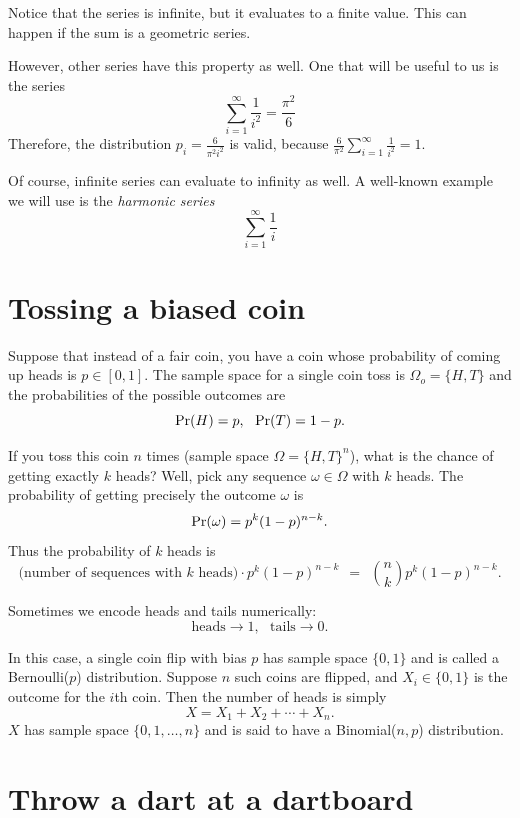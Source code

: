 Notice that the series is infinite, but it evaluates to a finite value. 
This can happen if the sum is a geometric series. 

However, other series have this property as well. 
One that will be useful to us is the series
$$ \sum_{i=1}^\infty \frac{1}{i^2} = \frac{\pi^2}{6} $$
Therefore, the distribution $p_i = \frac{6}{\pi^2 i^2}$ is valid, because $ \frac{6}{\pi^2} \sum_{i=1}^\infty \frac{1}{i^2} = 1 $.

Of course, infinite series can evaluate to infinity as well. 
A well-known example we will use is the \emph{harmonic series}
$$ \sum_{i=1}^\infty \frac{1}{i} $$




\section{Tossing a biased coin}
\label{sec:BaisedCoin}

Suppose that instead of a fair coin, you have a coin whose probability of coming up heads is $p \in [0,1]$. The sample space for a single coin toss is $\Omega_o = \{H,T\}$ and the probabilities of the possible outcomes are
$$ \mbox{\rm Pr}(H) = p, \ \ \mbox{\rm Pr}(T) = 1-p.$$

If you toss this coin $n$ times (sample space $\Omega = \{H,T\}^n$), what is the chance of getting exactly $k$ heads? Well, pick any sequence $\omega \in \Omega$ with $k$ heads. The probability of getting precisely the outcome $\omega$ is
$$ \mbox{\rm Pr}(\omega) = p^k (1-p)^{n-k} .$$
Thus the probability of $k$ heads is
$$ \mbox{(number of sequences with $k$ heads)} \cdot p^k (1-p)^{n-k} 
\ \ = \ \ 
{n \choose k} p^k (1-p)^{n-k} .$$

Sometimes we encode heads and tails numerically:
$$ \mbox{heads} \rightarrow 1, \ \ \ \mbox{tails} \rightarrow 0 .$$

In this case, a single coin flip with bias $p$ has sample space $\{0,1\}$ and is called a Bernoulli($p$) distribution. Suppose $n$ such coins are flipped, and $X_i \in \{0,1\}$ is the outcome for the $i$th coin. Then the number of heads is simply 
$$ X = X_1 + X_2 + \cdots + X_n. $$
$X$ has sample space $\{0,1,\ldots,n\}$ and is said to have a Binomial($n,p$) distribution.


\section{Throw a dart at a dartboard} 

